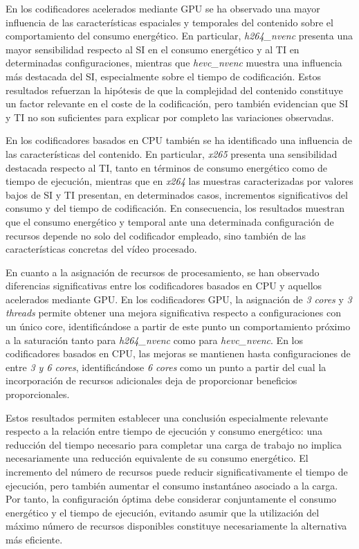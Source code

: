  En los codificadores acelerados mediante GPU se ha observado una mayor influencia de las características espaciales y temporales del contenido sobre el comportamiento del consumo energético. En particular, \textit{h264\_nvenc} presenta una mayor sensibilidad respecto al SI en el consumo energético y al TI en determinadas configuraciones, mientras que \textit{hevc\_nvenc} muestra una influencia más destacada del SI, especialmente sobre el tiempo de codificación. Estos resultados refuerzan la hipótesis de que la complejidad del contenido constituye un factor relevante en el coste de la codificación, pero también evidencian que SI y TI no son suficientes para explicar por completo las variaciones observadas.

 En los codificadores basados en CPU también se ha identificado una influencia de las características del contenido. En particular, \textit{x265} presenta una sensibilidad destacada respecto al TI, tanto en términos de consumo energético como de tiempo de ejecución, mientras que en \textit{x264} las muestras caracterizadas por valores bajos de SI y TI presentan, en determinados casos, incrementos significativos del consumo y del tiempo de codificación. En consecuencia, los resultados muestran que el consumo energético y temporal ante una determinada configuración de recursos depende no solo del codificador empleado, sino también de las características concretas del vídeo procesado.

 En cuanto a la asignación de recursos de procesamiento, se han observado diferencias significativas entre los codificadores basados en CPU y aquellos acelerados mediante GPU. En los codificadores GPU, la asignación de \textit{3 cores} y \textit{3 threads} permite obtener una mejora significativa respecto a configuraciones con un único core, identificándose a partir de este punto un comportamiento próximo a la saturación tanto para \textit{h264\_nvenc} como para \textit{hevc\_nvenc}. En los codificadores basados en CPU, las mejoras se mantienen hasta configuraciones de entre \textit{3 y 6 cores}, identificándose \textit{6 cores} como un punto a partir del cual la incorporación de recursos adicionales deja de proporcionar beneficios proporcionales.

 Estos resultados permiten establecer una conclusión especialmente relevante respecto a la relación entre tiempo de ejecución y consumo energético: una reducción del tiempo necesario para completar una carga de trabajo no implica necesariamente una reducción equivalente de su consumo energético. El incremento del número de recursos puede reducir significativamente el tiempo de ejecución, pero también aumentar el consumo instantáneo asociado a la carga. Por tanto, la configuración óptima debe considerar conjuntamente el consumo energético y el tiempo de ejecución, evitando asumir que la utilización del máximo número de recursos disponibles constituye necesariamente la alternativa más eficiente.

